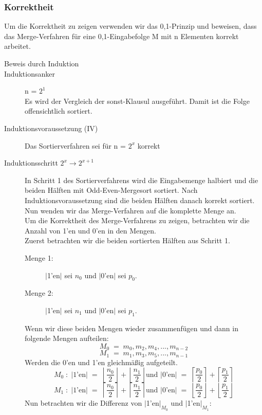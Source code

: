 \documentclass[11pt,ngerman]{article}
\begin{document}
\subsubsection{Korrektheit}
Um die Korrektheit zu zeigen verwenden wir das 0,1-Prinzip und beweisen, dass das Merge-Verfahren für eine 0,1-Eingabefolge M mit n Elementen korrekt arbeitet.
\begin{description}
\item[Beweis durch Induktion]
\item[Induktionsanker] n = $2^1$\\ Es wird der Vergleich der \glqq sonst\grqq -Klausul ausgeführt. Damit ist die Folge offensichtlich sortiert.
\item[Induktionsvoraussetzung (IV)] Das Sortierverfahren sei für n = $2^x$ korrekt
\item[Induktionsschritt  $2^x \rightarrow 2^{x+1}$]
In Schritt 1 des Sortierverfahrens wird die Eingabemenge halbiert und die beiden Hälften mit Odd-Even-Mergesort sortiert. Nach In\-duk\-tions\-vor\-aus\-set\-zung sind die beiden Hälften danach korrekt sortiert. Nun wenden wir das Merge-Verfahren auf die komplette Menge an.\\Um die Korrektheit des Merge-Verfahrens zu zeigen, betrachten wir die Anzahl von 1'en und 0'en in den Mengen.\\Zuerst betrachten wir die beiden sortierten Hälften aus Schritt 1. 
\begin{description}
\item[Menge 1:] $|$1'en$|$ sei $n_0$ und $|$0'en$|$ sei $p_0$.
\item[Menge 2:] $|$1'en$|$ sei $n_1$ und $|$0'en$|$ sei $p_1$.
\end{description}
 Wenn wir diese beiden Mengen wieder zusammenfügen und dann in folgende Mengen aufteilen: 
$$M_0 \; = \; m_0, m_2, m_4, ..., m_{n-2}$$ 
$$M_1 \; = \; m_1, m_3, m_5, ..., m_{n-1}$$ 
Werden die 0'en und 1'en \glqq gleichmäßig\grqq{} aufgeteilt. 
$$M_0 \; :\; | \text{1'en} | \; = \;\left\lfloor \frac{n_0}{2} \right\rfloor + \left\lfloor \frac{n_1}{2} \right\rfloor \text{und $|$0'en$|$} \;=\; \left\lceil \frac{p_0}{2} \right\rceil + \left\lceil \frac{p_1}{2} \right\rceil$$
$$M_1 \; :\; | \text{1'en} | \; = \;\left\lceil \frac{n_0}{2} \right\rceil + \left\lceil \frac{n_1}{2} \right\rceil  \text{und $|$0'en$|$} \;=\; \left\lfloor \frac{p_0}{2} \right\rfloor + \left\lfloor \frac{p_1}{2} \right\rfloor$$
Nun betrachten wir die Differenz von $|$1'en$|_{M_0}$ und $|$1'en$|_{M_1}$:
\begin{description}

\end{description}
\end{description}
\end{document}

